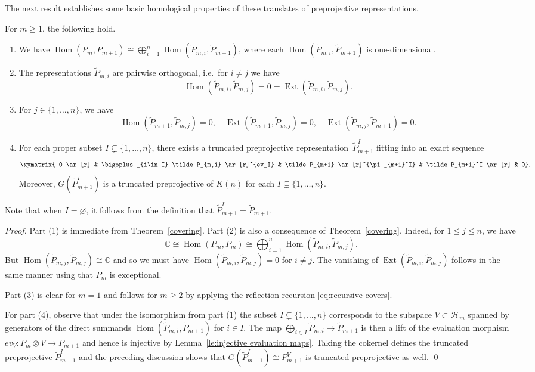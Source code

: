 \documentclass[smallextended,envcountsect,envcountsame]{svjour3}
\numberwithin{equation}{section}
\newcommand{\CC}{\mathbb{C}}
\newcommand{\cH}{\mathcal{H}}
\newcommand{\Ext}{\operatorname{Ext}}
\newcommand{\Hom}{\operatorname{Hom}}
\begin{document}
The next result establishes some basic homological properties of these translates of preprojective representations.
\begin{lemma}
  \label{le:homdecomposition}
  For $m\geq 1$, the following hold.
  \begin{enumerate}
    \item We have $\Hom(P_m,P_{m+1})\cong\bigoplus\limits_{i=1}^n \Hom(\tilde P_{m,i},\tilde P_{m+1})$, where each $\Hom(\tilde P_{m,i},\tilde P_{m+1})$ is one-dimensional.
    \item The representations $\tilde P_{m,i}$ are pairwise orthogonal, i.e.\ for $i\neq j$ we have 
      \[\Hom(\tilde P_{m,i},\tilde P_{m,j})=0=\Ext(\tilde P_{m,i},\tilde P_{m,j}).\]
    \item For $j\in\{1,\ldots,n\}$, we have
      \[\Hom(\tilde P_{m+1},\tilde P_{m,j})=0,\quad\Ext(\tilde P_{m+1},\tilde P_{m,j})=0,\quad\Ext(\tilde P_{m,j},\tilde P_{m+1})=0.\]
    \item For each proper subset $I\subsetneq\{1,\ldots,n\}$, there exists a truncated preprojective representation~$\tilde P_{m+1}^I$ fitting into an exact sequence 
      \begin{equation}
        \label{ses1}
        \xymatrix{ 0 \ar[r] & \bigoplus_{i\in I} \tilde P_{m,i} \ar[r]^{ev_I} & \tilde P_{m+1} \ar[r]^{\pi_{m+1}^I} & \tilde P_{m+1}^I \ar[r] & 0}.
      \end{equation}
      Moreover, $G(\tilde P_{m+1}^I)$ is a truncated preprojective of $K(n)$ for each $I\subsetneq\{1,\ldots,n\}$.
  \end{enumerate}
\end{lemma}
\begin{remark}
  Note that when $I=\varnothing$, it follows from the definition that $\tilde P_{m+1}^I=\tilde P_{m+1}$.
\end{remark}
\begin{proof}
  Part (1) is immediate from Theorem~\ref{covering}.
  Part (2) is also a consequence of Theorem~\ref{covering}.
  Indeed, for $1\leq j\leq n$, we have 
  $$\CC\cong\Hom(P_m,P_m)\cong\bigoplus_{i=1}^n \Hom(\tilde P_{m,i},\tilde P_{m,j}).$$
  But $\Hom(\tilde P_{m,j},\tilde P_{m,j})\cong\CC$ and so we must have $\Hom(\tilde P_{m,i},\tilde P_{m,j})=0$ for $i\neq j$.
  The vanishing of $\Ext(\tilde P_{m,i},\tilde P_{m,j})$ follows in the same manner using that $P_m$ is exceptional.

  Part (3) is clear for $m=1$ and follows for $m\ge2$ by applying the reflection recursion \eqref{eq:recursive covers}.

  For part (4), observe that under the isomorphism from part (1) the subset $I\subsetneq\{1,\ldots,n\}$ corresponds to the subspace $V\subset \cH_m$ spanned by generators of the direct summands $\Hom(\tilde P_{m,i},\tilde P_{m+1})$ for $i\in I$.
  The map $\bigoplus_{i\in I} \tilde P_{m,i}\to\tilde P_{m+1}$ is then a lift of the evaluation morphism $ev_V:P_m\otimes V\to P_{m+1}$ and hence is injective by Lemma~\ref{le:injective evaluation maps}.
  Taking the cokernel defines the truncated preprojective $\tilde P_{m+1}^I$ and the preceding discussion shows that $G(\tilde P_{m+1}^I)\cong P_{m+1}^V$ is truncated preprojective as well.
\qed\end{proof}
\end{document}
